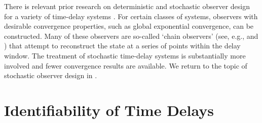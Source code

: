 \documentclass[letterpaper,10pt,conference]{ieeeconf}
\theoremstyle{definition}
\begin{document}
There is relevant prior research on deterministic and stochastic observer design for a variety of time-delay systems \cite{2001_Sename_New}.
% 
For certain classes of systems, observers with desirable convergence properties, such as global exponential convergence, can be constructed.
%
Many of these observers are so-called `chain observers' (see, e.g., \cite{2002_Germani_New} and \cite{2005_Kazantzis_Nonlinear}) that attempt to reconstruct the state at a series of points within the delay window.
%
The treatment of stochastic time-delay systems is substantially more involved and fewer convergence results are available.
%
We return to the topic of stochastic observer design in .

\section{Identifiability of Time Delays}
\label{sec:ident}

\end{document}
